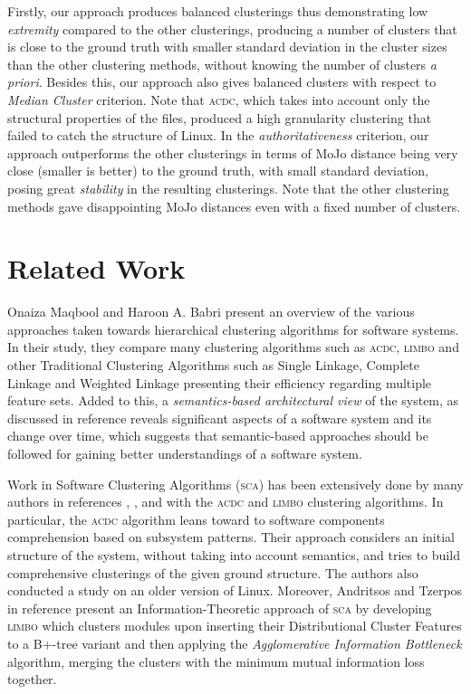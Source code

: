 \documentclass[sigconf,review, anonymous]{acmart}
\begin{document}
Firstly, our approach produces balanced clusterings thus demonstrating low \emph{extremity} compared to the other clusterings, 
producing a number of clusters that is close to the ground truth with smaller standard deviation in the cluster sizes than 
the other clustering methods, without knowing the number of clusters \emph{a priori}. 
Besides this, our approach also gives balanced clusters with respect to \emph{Median Cluster} criterion. 
Note that \textsc{acdc}, which takes into account only the structural properties of the files, produced a high 
granularity clustering that failed to catch the structure of Linux. 
In the \emph{authoritativeness} criterion, our approach outperforms the other clusterings
in terms of MoJo distance being very close (smaller is better) to the ground truth, with small standard deviation, posing great \emph{stability} in the resulting clusterings. 
Note that the other clustering methods gave disappointing MoJo distances even with a fixed number of clusters. 

\section{Related Work}

Onaiza Maqbool and Haroon A. Babri \cite{maqbool_overview} present an
overview of the various approaches taken towards hierarchical clustering algorithms
for software systems. In their study, they compare many clustering algorithms
such as \textsc{acdc}, \textsc{limbo} and other Traditional Clustering Algorithms such as Single
Linkage, Complete Linkage and Weighted Linkage presenting their efficiency regarding 
multiple feature sets. 
Added to this, a \emph{semantics-based architectural view} of the system, as discussed in reference
\cite{large_study} reveals significant aspects of a software system and its change over 
time, which suggests that semantic-based approaches should be followed for gaining better 
understandings of a software system. 

Work in Software Clustering Algorithms (\textsc{sca}) has been extensively done by many authors in
references \cite{mojo}, \cite{stability}, \cite{acdc} and \cite{limbo} with the \textsc{acdc}
and \textsc{limbo} clustering algorithms. 
In particular, the \textsc{acdc} algorithm leans toward to software components comprehension 
based on subsystem patterns. Their approach considers an initial structure of the system, 
without taking into account semantics, and tries to build comprehensive clusterings of the given ground structure. 
The authors also conducted a study on an older version of  Linux. 
Moreover, Andritsos and Tzerpos in reference \cite{limbo} present an Information-Theoretic 
approach of \textsc{sca} by developing \textsc{limbo} which clusters modules upon inserting their Distributional Cluster Features 
to a B+-tree variant and then applying the \emph{Agglomerative Information Bottleneck} algorithm, merging the 
clusters with the minimum mutual information loss together. 
\end{document}
